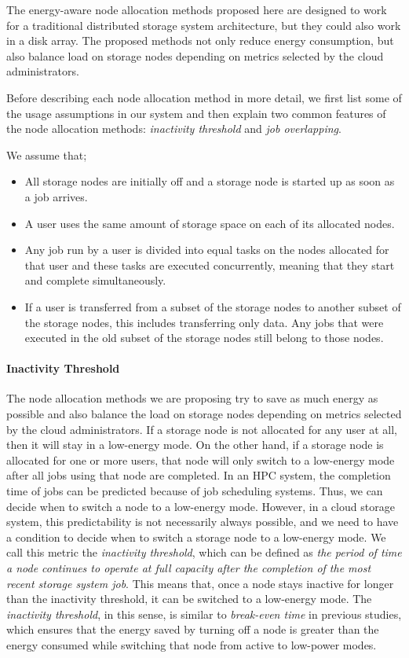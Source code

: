 \documentclass[preprint,12pt]{elsarticle}
\begin{document}
The energy-aware node allocation methods proposed here are designed to work for a traditional
distributed storage system architecture, but they could also work in a disk array. The
proposed methods not only reduce energy consumption, but also balance load on storage
nodes depending on metrics selected by the cloud administrators.

Before describing each node allocation method in more detail, we first list some of the usage
assumptions in our system and then explain two common
features of the node allocation methods: \textit{inactivity threshold} and \textit{job overlapping}.

We assume that;
\begin{itemize}
\item All storage nodes are initially off and a storage node is started up as soon as a
job arrives.
\item A user uses the same amount of storage space on each of its allocated nodes.
\item Any job run by a user is divided into equal tasks on the nodes allocated for
that user and these tasks are executed concurrently, meaning that they start and
complete simultaneously.
\item If a user is transferred from a subset of the storage nodes to another subset of
the storage nodes, this includes transferring only data. Any jobs that were executed
in the old subset of the storage nodes still belong to those nodes.
\end{itemize}

\paragraph{Inactivity Threshold}
The node allocation methods we are proposing try to save as much energy as possible and
also balance the load on storage nodes depending on metrics selected by the cloud administrators.
If a storage node is not allocated for any user at all, then it will stay in a low-energy mode.
On the other hand, if a storage node is allocated for one or more users, that node will
only switch to a low-energy mode after all jobs using that node are completed.
In an HPC system, the completion time of jobs can be predicted because of job scheduling systems.
Thus, we can decide when to switch a node to a low-energy mode. However, in a cloud storage system,
this predictability is not necessarily always possible, and we need to have a condition to decide when to switch a 
storage node to a low-energy mode. We call this metric the \textit{inactivity threshold}, which
can be defined as \textit{the period of time a node continues to operate at full capacity after the
completion of the most recent storage system job}. This means that, once a node stays inactive for
longer than the inactivity threshold, it can be switched to a
low-energy mode. The \textit{inactivity
threshold}, in this sense, is similar to \textit{break-even time} in previous studies, which ensures
that the energy saved by turning off a node is greater than the energy consumed while switching
that node from active to low-power modes.
\end{document}
